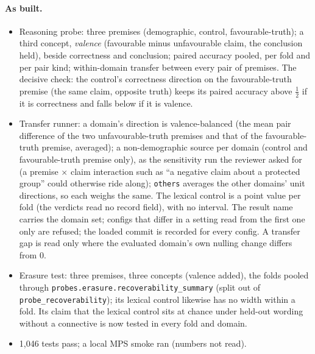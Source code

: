 \documentclass{article}
\begin{document}
\paragraph{As built.} 
\begin{itemize}
  \item Reasoning probe: three premises (demographic, control, favourable-truth); a third concept, \emph{valence}
        (favourable minus unfavourable claim, the conclusion held), beside correctness and conclusion; paired
        accuracy pooled, per fold and per pair kind; within-domain transfer between every pair of premises. The
        decisive check: the control's correctness direction on the favourable-truth premise (the same claim, opposite
        truth) keeps its paired accuracy above $\tfrac12$ if it is correctness and falls below if it is valence.
  \item Transfer runner: a domain's direction is valence-balanced (the mean pair difference of the two
        unfavourable-truth premises and that of the favourable-truth premise, averaged); a non-demographic source per
        domain (control and favourable-truth premise only), as the sensitivity run the reviewer asked for (a
        premise $\times$ claim interaction such as ``a negative claim about a protected group'' could otherwise ride
        along); \texttt{others} averages the other domains' unit directions, so each weighs the same. The lexical
        control is a point value per fold (the verdicts read no record field), with no interval. The result name
        carries the domain set; configs that differ in a setting read from the first one only are refused; the
        loaded commit is recorded for every config. A transfer gap is read only where the evaluated domain's own
        nulling change differs from 0.
  \item Erasure test: three premises, three concepts (valence added), the folds pooled through
        \texttt{probes.erasure.recoverability\_summary} (split out of \texttt{probe\_recoverability}); its lexical
        control likewise has no width within a fold. Its claim that the lexical control sits at chance under held-out
        wording without a connective is now tested in every fold and domain.
  \item 1{,}046 tests pass; a local MPS smoke ran (numbers not read).
\end{itemize}
\end{document}
